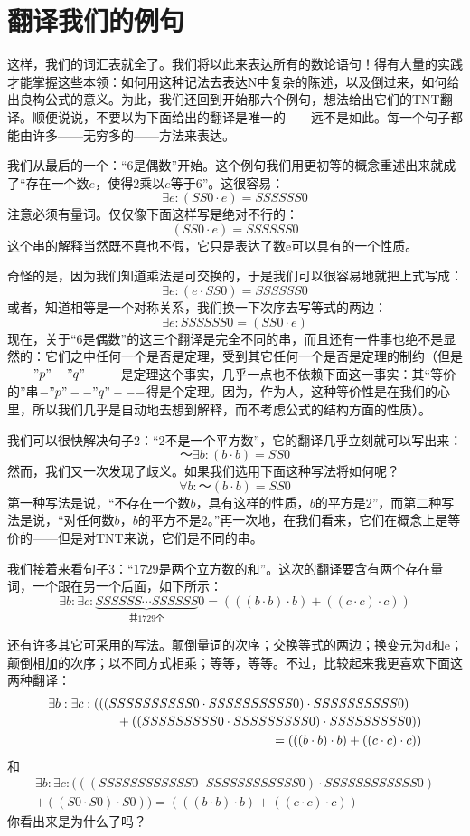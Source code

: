 \section{翻译我们的例句}

这样，我们的词汇表就全了。我们将以此来表达所有的数论语句！得有大量的实践才能掌握这些本领：如何用这种记法去表达N中复杂的陈述，以及倒过来，如何给出良构公式的意义。为此，我们还回到开始那六个例句，想法给出它们的TNT翻译。顺便说说，不要以为下面给出的翻译是唯一的——远不是如此。每一个句子都能由许多——无穷多的——方法来表达。

我们从最后的一个：“$6$是偶数”开始。这个例句我们用更初等的概念重述出来就成了“存在一个数$e$，使得$2$乘以$e$等于$6$”。这很容易：
\[
\exists e:(SS0\cdot e)=SSSSSS0
\]
注意必须有量词。仅仅像下面这样写是绝对不行的：
\[
(SS0\cdot e)=SSSSSS0
\]
这个串的解释当然既不真也不假，它只是表达了数e可以具有的一个性质。

奇怪的是，因为我们知道乘法是可交换的，于是我们可以很容易地就把上式写成：
\[
\exists e:(e\cdot SS0)=SSSSSS0
\]
或者，知道相等是一个对称关系，我们换一下次序去写等式的两边：
\[
\exists e:SSSSSS0=(SS0\cdot e)
\]
\MakeMinusOrd
现在，关于“$6$是偶数”的这三个翻译是完全不同的串，而且还有一件事也绝不是显然的：它们之中任何一个是否是定理，受到其它任何一个是否是定理的制约（但是$--"p"-"q"---$是定理这个事实，几乎一点也不依赖下面这一事实：其“等价的”串$-"p"--"q"---$得是个定理。因为，作为人，这种等价性是在我们的心里，所以我们几乎是自动地去想到解释，而不考虑公式的结构方面的性质）。
\MakeMinusBin

我们可以很快解决句子2：“$2$不是一个平方数”，它的翻译几乎立刻就可以写出来：
\[
～\exists b:(b\cdot b)=SS0
\]
然而，我们又一次发现了歧义。如果我们选用下面这种写法将如何呢？
\[
\forall b:～(b\cdot b)=SS0
\]
第一种写法是说，“不存在一个数$b$，具有这样的性质，$b$的平方是$2$”，而第二种写法是说，“对任何数$b$，$b$的平方不是$2$。”再一次地，在我们看来，它们在概念上是等价的——但是对TNT来说，它们是不同的串。

我们接着来看句子3：“$1729$是两个立方数的和”。这次的翻译要含有两个存在量词，一个跟在另一个后面，如下所示：
\[
\exists b: \exists c:
\underbrace{SSSSSS\cdots SSSSSS}_{\text{共$1729$个}}0
=(((b\cdot b)\cdot b)+((c\cdot c)\cdot c))
\]

还有许多其它可采用的写法。颠倒量词的次序；交换等式的两边；换变元为d和e；颠倒相加的次序；以不同方式相乘；等等，等等。不过，比较起来我更喜欢下面这两种翻译：
\[
\begin{multlined}
\exists b:\exists c:(((SSSSSSSSSS0\cdot SSSSSSSSSS0)\cdot SSSSSSSSSS0)\\
  \shoveright{{} + ((SSSSSSSSS0\cdot SSSSSSSSS0)\cdot SSSSSSSSS0))} \\
  {} = (((b\cdot b)\cdot b)+((c\cdot c)\cdot c))
\end{multlined}
\]
和
\[
\begin{multlined}
\exists b:\exists c:(((SSSSSSSSSSSS0\cdot SSSSSSSSSSSS0)
  \cdot SSSSSSSSSSSS0) \\
+((S0\cdot S0)\cdot S0))=(((b\cdot b)\cdot b)+((c\cdot c)\cdot c))
\end{multlined}
\]
你看出来是为什么了吗？

